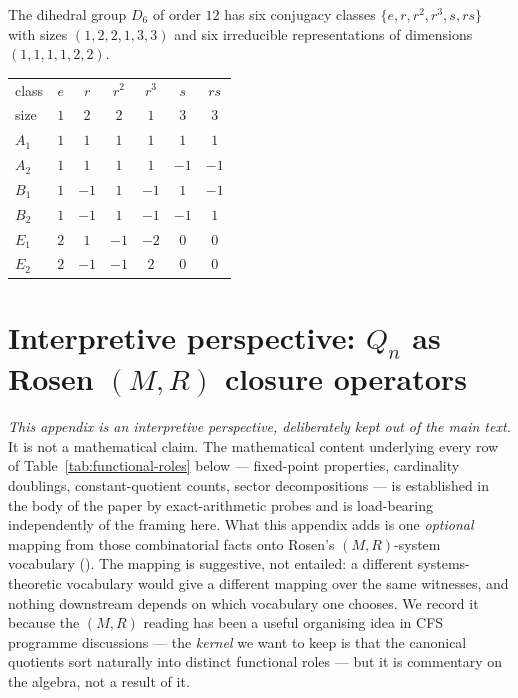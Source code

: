 \documentclass[12pt,a4paper]{article}
\theoremstyle{definition}
\theoremstyle{remark}
\newcommand{\Qn}{Q_n}
\begin{document}
The dihedral group $D_6$ of order $12$ has six conjugacy classes
$\{e, r, r^2, r^3, s, rs\}$ with sizes $(1, 2, 2, 1, 3, 3)$ and six
irreducible representations of dimensions $(1, 1, 1, 1, 2, 2)$.

\smallskip
\begin{center}\small
\begin{tabular}{lcccccc}
\toprule
class & $e$ & $r$ & $r^2$ & $r^3$ & $s$ & $rs$ \\
size  & $1$ & $2$ & $2$   & $1$   & $3$ & $3$  \\
\midrule
$A_1$ & $1$ & $1$  & $1$  & $1$  & $1$  & $1$  \\
$A_2$ & $1$ & $1$  & $1$  & $1$  & $-1$ & $-1$ \\
$B_1$ & $1$ & $-1$ & $1$  & $-1$ & $1$  & $-1$ \\
$B_2$ & $1$ & $-1$ & $1$  & $-1$ & $-1$ & $1$  \\
$E_1$ & $2$ & $1$  & $-1$ & $-2$ & $0$  & $0$  \\
$E_2$ & $2$ & $-1$ & $-1$ & $2$  & $0$  & $0$  \\
\bottomrule
\end{tabular}
\end{center}

\section{Interpretive perspective: $\Qn$ as Rosen $(M, R)$ closure
operators}\label{sec:functional-roles}

\emph{This appendix is an interpretive perspective, deliberately kept
out of the main text.} It is not a mathematical claim. The mathematical
content underlying every row of Table~\ref{tab:functional-roles} below
--- fixed-point properties, cardinality doublings, constant-quotient
counts, sector decompositions --- is established in the body of the
paper by exact-arithmetic probes and is load-bearing independently of
the framing here. What this appendix adds is one \emph{optional} mapping
from those combinatorial facts onto Rosen's $(M, R)$-system vocabulary
(\cite{Rosen1991}). The mapping is suggestive, not entailed: a different
systems-theoretic vocabulary would give a different mapping over the
same witnesses, and nothing downstream depends on which vocabulary one
chooses. We record it because the $(M, R)$ reading has been a useful
organising idea in CFS programme discussions --- the \emph{kernel} we
want to keep is that the canonical quotients sort naturally into
distinct functional roles --- but it is commentary on the algebra, not
a result of it.
\end{document}
